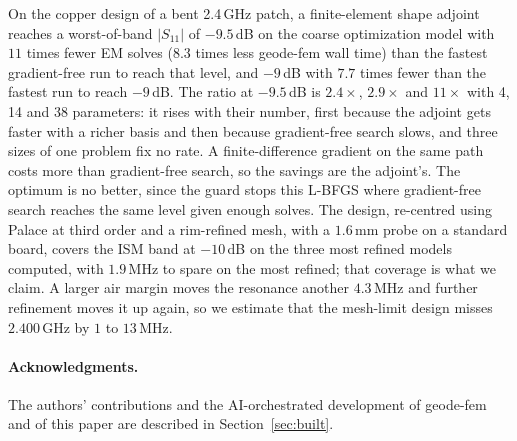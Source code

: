 \documentclass{anvil-paper}
\begin{document}
On the copper design of a bent 2.4\,GHz patch, a finite-element shape
adjoint reaches a worst-of-band $|S_{11}|$ of $-9.5$\,dB on the coarse
optimization model with $11$ times fewer EM solves ($8.3$ times less geode-fem
wall time) than the fastest gradient-free run to reach that level, and
$-9$\,dB with $7.7$ times fewer than the fastest run to reach $-9$\,dB. The
ratio at $-9.5$\,dB is $2.4\times$, $2.9\times$ and $11\times$ with 4, 14
and 38 parameters: it rises with their number, first because the adjoint gets
faster with a richer basis and then because gradient-free search slows, and
three sizes of one problem fix no rate. A finite-difference gradient on the
same path costs more than gradient-free search, so the savings are the
adjoint's. The optimum is no better, since the guard stops this L-BFGS where
gradient-free search reaches the same level given enough solves. The design,
re-centred using Palace at third order and a rim-refined mesh, with a
$1.6$\,mm probe on a standard board, covers the ISM band at $-10$\,dB on the
three most refined models computed, with $1.9$\,MHz to spare on the most
refined; that coverage is what we claim. A larger air margin moves the
resonance another $4.3$\,MHz and further refinement moves it up again, so we
estimate that the mesh-limit design misses $2.400$\,GHz by $1$ to $13$\,MHz.

\paragraph{Acknowledgments.}
The authors' contributions and the AI-orchestrated development of
geode-fem and of this paper are described in Section~\ref{sec:built}.



\end{document}
